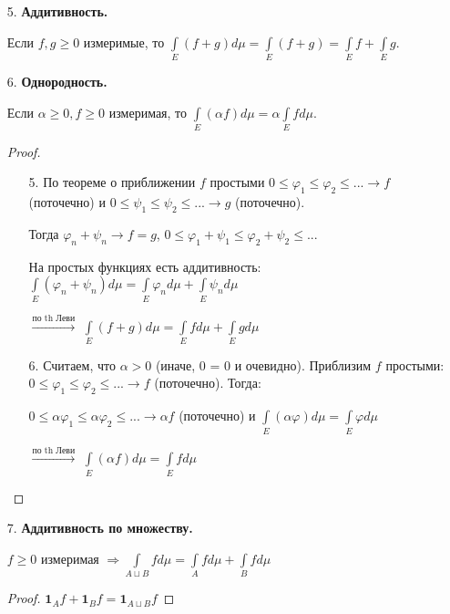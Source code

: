 \begin{enumerate}
    \item[5.] \textbf{Аддитивность.}
    
    Если $f, g\geq 0$ измеримые, то $\int \limits_E(f+g) d\mu =
    \int \limits_E(f+g)=\int \limits_E f+\int \limits_E g$.

    \item[6.] \textbf{Однородность.}
    
    Если $\alpha \geq 0, f\geq 0$ измеримая, то $\int \limits_E(\alpha f) d\mu =
    \alpha\int \limits_E f d\mu$.

    \begin{proof}~
        \begin{enumerate}
            \item[5.] По теореме о приближении $f$ простыми $0\leq \varphi_1\leq 
            \varphi_2\leq ... \rightarrow f$ (поточечно) и $0\leq \psi_1\leq \psi_2\leq ... \rightarrow g$ (поточечно).

            Тогда $\varphi_n + \psi_n \rightarrow f = g$, $0\leq \varphi_1 + \psi_1\leq \varphi_2 + \psi_2\leq ...$ 

            На простых функциях есть аддитивность: $\int\limits_E (\varphi_n + \psi_n) d\mu =\int\limits_E \varphi_n d\mu + \int\limits_E \psi_n d\mu$

            $\overset{\text{по th Леви}}{\rightarrow}$ $\int\limits_E (f + g) d\mu =\int\limits_E f d\mu + \int\limits_E g d\mu$
            
            \item[6.] Считаем, что $\alpha > 0$ (иначе, 0 = 0 и очевидно). Приблизим $f$ простыми: $0\leq \varphi_1\leq 
            \varphi_2\leq ... \rightarrow f$ (поточечно). Тогда:

            $0\leq \alpha \varphi_1\leq\alpha \varphi_2\leq ... \rightarrow \alpha f$ (поточечно) и $\int\limits_E (\alpha \varphi)d\mu =\int\limits_E \varphi d\mu $

            $\overset{\text{по th Леви}}{\rightarrow}$ $\int\limits_E (\alpha f)d\mu =\int\limits_E f d\mu $
        \end{enumerate}
    \end{proof}

    \item[7.] \textbf{Аддитивность по множеству.}
    
    $f\geq 0$ измеримая $\Rightarrow \int\limits_{A\sqcup B}f d\mu = \int\limits_A f d\mu +\int\limits_B f d\mu $

    \begin{proof}
        $\mathbf{1}_A f+\mathbf{1}_B f =\mathbf{1}_{A\sqcup B} f$
    \end{proof}


\end{enumerate}
